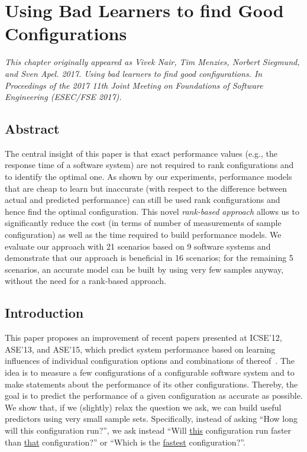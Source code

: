 \chapter{Using Bad Learners to find Good Configurations}
\label{chapter:rank}

\noindent\textit{This chapter originally appeared as 
Vivek Nair, Tim Menzies, Norbert Siegmund, and Sven Apel. 2017. Using bad learners to find good configurations. In Proceedings of the 2017 11th Joint Meeting on Foundations of Software Engineering (ESEC/FSE 2017).}


\section{Abstract}

The central  insight of this paper is that   
exact performance values (e.g., the response time of a software system) are not required to rank  configurations and to identify the optimal one. 
As shown by our experiments, performance models that are cheap to learn but inaccurate (with respect to the difference between actual and predicted performance) can still be used rank configurations and hence find the optimal configuration. This novel \emph{rank-based approach} allows us to significantly reduce the cost (in terms of number of measurements of sample configuration) as well as the time required to build performance models. We evaluate our approach with 21 scenarios based on 9 software systems and demonstrate that our approach is beneficial in 16 scenarios; for the remaining 5 scenarios, an accurate model can be built by using very few samples anyway, without the need for a rank-based approach.




\section{Introduction}
This paper proposes an improvement of recent papers presented at ICSE'12, ASE'13, and ASE'15, which predict system performance based on learning influences of individual configuration options and combinations of thereof~\cite{siegmund2012predicting,guo2013variability,sarkar2015cost}. The idea is to measure a few configurations of a configurable software system and to make statements about the performance of its other configurations. Thereby, the goal is to predict the performance of a given configuration as accurate as possible.
We show that, if we (slightly) relax the
question we ask, we can build useful predictors using very small sample sets. Specifically,
instead of asking ``How long will this configuration run?'', we
ask instead ``Will \underline{this} configuration run faster than \underline{that} configuration?'' or ``Which is the \underline{fastest} configuration?''. 


